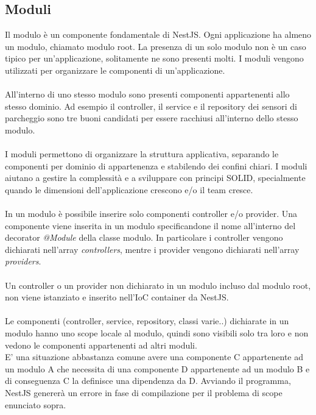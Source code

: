 \subsection{Moduli}
Il modulo è un componente fondamentale di NestJS. Ogni applicazione ha almeno un modulo, chiamato modulo root. 
La presenza di un solo modulo non è un caso tipico per un'applicazione, solitamente ne sono presenti molti.
I moduli vengono utilizzati per organizzare le componenti di un'applicazione.
\\\\
All'interno di uno stesso modulo sono presenti componenti appartenenti allo stesso dominio. Ad esempio
il controller, il service e il repository dei sensori di parcheggio sono tre buoni candidati per essere racchiusi 
all'interno dello stesso modulo.
\\\\
I moduli permettono di organizzare la struttura applicativa, separando le componenti per dominio di appartenenza
e stabilendo dei confini chiari. I moduli aiutano a gestire la complessità e a 
sviluppare con principi SOLID, specialmente quando le dimensioni dell'applicazione crescono e/o il team cresce.
\\\\
In un modulo è possibile inserire solo componenti controller e/o provider. Una componente viene inserita in un modulo
specificandone il nome all'interno del decorator
\textit{@Module} della classe modulo. In particolare i controller vengono dichiarati 
nell'array \textit{controllers},
mentre i provider vengono dichiarati nell'array \textit{providers}. 
\\\\
Un controller o un provider non dichiarato in un modulo incluso dal modulo
root, non viene istanziato e inserito nell'IoC container da NestJS.
\\\\
Le componenti (controller, service, repository, classi varie..) dichiarate 
in un modulo hanno uno scope locale al modulo, quindi sono visibili solo tra loro e non vedono
le componenti appartenenti ad altri moduli.
\\
E' una situazione abbastanza comune avere una componente C appartenente ad un modulo A che necessita di una componente D
appartenente ad un modulo B
e di conseguenza C la definisce una dipendenza da D. Avviando il programma, NestJS genererà un errore in fase di compilazione per il problema
di scope enunciato sopra.
\\\\
